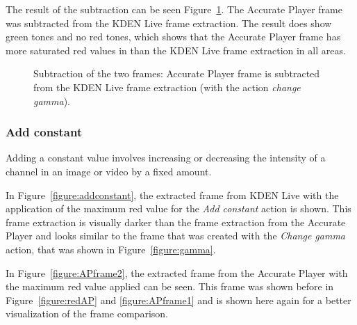 \documentclass[../MasterThesis.tex]{subfiles}
\begin{document}
\newpage

The result of the subtraction can be seen Figure~\ref{figure:gammagimp}. The Accurate Player frame was subtracted from the KDEN Live frame extraction. The result does show green tones and no red tones, which shows that the Accurate Player frame has more saturated red values in than the KDEN Live frame extraction in all areas.



\begin{figure}[H]
	\begin{center}
		\caption[Subtraction of KDEN Live (\textit{change gamma}) and Accurate Player.]{Subtraction of the two frames: Accurate Player frame is subtracted from the KDEN Live frame extraction (with the action \textit{change gamma}).}
		\label{figure:gammagimp}
	\end{center}
\end{figure}








\subsubsection*{Add constant}

Adding a constant value involves increasing or decreasing the intensity of a channel in an image or video by a fixed amount. 

In Figure~\ref{figure:addconstant}, the extracted frame from KDEN Live with the application of the maximum red value for the \textit{Add constant} action is shown. This frame extraction is visually darker than the frame extraction from the Accurate Player and looks similar to the frame that was created with the \textit{Change gamma} action, that was shown in Figure~\ref{figure:gamma}.

In Figure~\ref{figure:APframe2}, the extracted frame from the Accurate Player with the maximum red value applied can be seen. This frame was shown before in Figure~\ref{figure:redAP} and \ref{figure:APframe1} and is shown here again for a better visualization of the frame comparison.
\end{document}

